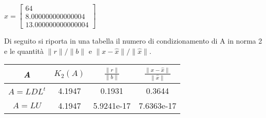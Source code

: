 \begin{flushleft}
\begin{center}
			$x = \begin{bmatrix}
				64\\
				8.000000000000004\\
				13.000000000000004
			\end{bmatrix}$\\[0.5cm]
			\end{center}
			Di seguito si riporta in una tabella il numero di condizionamento di A in norma 2 e le quantità $\|r\|/\|b\|$ e $\|x-\hat{x}\|/\|\hat{x}\|$.\\[0.5cm]
			\begin{center}
				\begin{tabular}{| c | c | c | c |}
					\hline
						\textit{A} & $K_2(A)$ & $\frac{\|r\|}{\|b\|}$ & $\frac{\|x-\hat{x}\|}{\|\hat{x}\|}$ \\
					\hline
						$A= LDL^{t}$ & 4.1947 & 0.1931 & 0.3644\\
						$A= LU$ & 4.1947 & 5.9241e-17 & 7.6363e-17\\
					\hline
				\end{tabular}
			\end{center}
\end{flushleft}